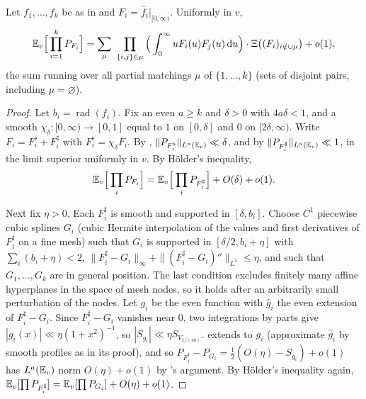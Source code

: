 \documentclass[11pt,colorlinks]{charlie}
\newcommand{\rad}{\operatorname{rad}}
\begin{document}
\begin{proposition}\label{prop:primemoments}
Let $f_1,\dots,f_k$ be as in  and $F_i=\widehat f_i|_{[0,\infty)}$. Uniformly in $v$,
\[
 \E_v\Big[\prod_{i=1}^kP_{F_i}\Big]=\sum_\mu\ \prod_{\{i,j\}\in\mu}\Big(\int_0^\infty uF_i(u)F_j(u)\dd u\Big)\cdot\Xi\big((F_i)_{i\notin\cup\mu}\big)+o(1),
\]
the sum running over all partial matchings $\mu$ of $\{1,\dots,k\}$ (sets of disjoint pairs, including $\mu=\varnothing$).
\end{proposition}
\begin{proof}
Let $b_i=\rad(f_i)$. Fix an even $a\ge k$ and $\delta>0$ with $4a\delta<1$, and a smooth $\chi_\delta:[0,\infty)\to[0,1]$ equal to $1$ on $[0,\delta]$ and $0$ on $[2\delta,\infty)$. Write $F_i=F_i^\flat+F_i^\sharp$ with $F_i^\flat=\chi_\delta F_i$. By , $\|P_{F_i^\flat}\|_{L^a(\mathbb{E}_v)}\ll\delta$, and by  $\|P_{F_i^\sharp}\|_{L^a(\mathbb{E}_v)}\ll1$, in the limit superior uniformly in $v$. By Hölder's inequality,
\begin{equation}\label{eq:low-cut}
 \mathbb{E}_v\Big[\prod_iP_{F_i}\Big]=\mathbb{E}_v\Big[\prod_iP_{F_i^\sharp}\Big]+O(\delta)+o(1).
\end{equation}

Next fix $\eta>0$. Each $F_i^\sharp$ is smooth and supported in $[\delta,b_i]$. Choose $C^1$ piecewise cubic splines $G_i$ (cubic Hermite interpolation of the values and first derivatives of $F_i^\sharp$ on a fine mesh) such that $G_i$ is supported in $[\delta/2,b_i+\eta]$ with $\sum_i(b_i+\eta)<2$, $\|F_i^\sharp-G_i\|_\infty+\|(F_i^\sharp-G_i)''\|_{L^1}\le\eta$, and such that $G_1,\dots,G_k$ are in general position. The last condition excludes finitely many affine hyperplanes in the space of mesh nodes, so it holds after an arbitrarily small perturbation of the nodes. Let $g_i$ be the even function with $\widehat g_i$ the even extension of $F_i^\sharp-G_i$. Since $F_i^\sharp-G_i$ vanishes near $0$, two integrations by parts give $|g_i(x)|\ll\eta(1+x^2)^{-1}$, so $|S_{g_i}|\ll\eta S_{V_{1/(4a)}}$.  extends to $g_i$ (approximate $\widehat g_i$ by smooth profiles as in its proof), and so $P_{F_i^\sharp}-P_{G_i}=\tfrac12(O(\eta)-S_{g_i})+o(1)$ has $L^a(\mathbb{E}_v)$ norm $O(\eta)+o(1)$ by 's argument. By Hölder's inequality again, $\mathbb{E}_v[\prod P_{F_i^\sharp}]=\mathbb{E}_v[\prod P_{G_i}]+O(\eta)+o(1)$.


\end{proof}
\end{document}
